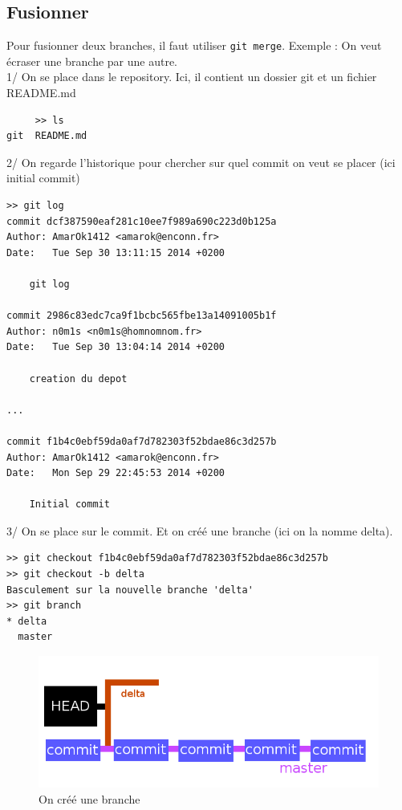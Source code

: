 \documentclass[a4paper,10pt]{report}
\begin{document}
     \subsection{Fusionner}
     Pour fusionner deux branches, il faut utiliser \verb|git merge|.
     Exemple : On veut \'ecraser une branche par une autre.\\
     1/ On se place dans le repository. Ici, il contient un dossier git et un fichier README.md
\begin{verbatim}
     >> ls
git  README.md
\end{verbatim}
     2/ On regarde l'historique pour chercher sur quel commit on veut se placer (ici initial commit)
\begin{verbatim}
>> git log
commit dcf387590eaf281c10ee7f989a690c223d0b125a
Author: AmarOk1412 <amarok@enconn.fr>
Date:   Tue Sep 30 13:11:15 2014 +0200

    git log

commit 2986c83edc7ca9f1bcbc565fbe13a14091005b1f
Author: n0m1s <n0m1s@homnomnom.fr>
Date:   Tue Sep 30 13:04:14 2014 +0200

    creation du depot

...

commit f1b4c0ebf59da0af7d782303f52bdae86c3d257b
Author: AmarOk1412 <amarok@enconn.fr>
Date:   Mon Sep 29 22:45:53 2014 +0200

    Initial commit
\end{verbatim}
    3/ On se place sur le commit. Et on cr\'e\'e une branche (ici on la nomme delta).
 \begin{verbatim}
>> git checkout f1b4c0ebf59da0af7d782303f52bdae86c3d257b
>> git checkout -b delta
Basculement sur la nouvelle branche 'delta'
>> git branch
* delta
  master
\end{verbatim}
\begin{figure}[h!]
  \begin{center}
    \includegraphics[scale=0.3]{images/3exp}
    \caption{On cr\'e\'e une branche}
    \label{3exp}
  \end{center}
\end{figure}
\end{document}
